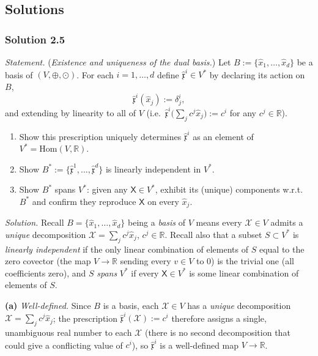 \documentclass[11pt]{article}
\newcommand{\Vsp}{(V, \oplus, \odot)}
\newcommand{\dual}{V^{*}}
\begin{document}
\subsection*{Solutions}

\subsubsection*{Solution 2.5}

\noindent\textit{Statement.} (\textit{Existence and uniqueness of the dual basis.})
Let $B := \{\hat{x}_1,\dots,\hat{x}_d\}$ be a basis of $\Vsp$. For each $i = 1,\dots,d$ define $\hat{\mathfrak{x}}^i \in \dual$ by declaring its action on $B$,
\[
\hat{\mathfrak{x}}^i(\hat{x}_j) := \delta^i_j,
\]
and extending by linearity to all of $V$ (i.e.\ $\hat{\mathfrak x}^i\big(\sum_j c^j\hat x_j\big):=c^i$ for any $c^j\in\mathbb R$).
\begin{enumerate}[label=(\alph*)]
  \item Show this prescription uniquely determines $\hat{\mathfrak{x}}^i$ as an element of $\dual = \mathrm{Hom}(V,\mathbb{R})$.
  \item Show $B^* := \{\hat{\mathfrak{x}}^1,\dots,\hat{\mathfrak{x}}^d\}$ is linearly independent in $\dual$.
  \item Show $B^*$ spans $\dual$: given any $\mathsf{X} \in \dual$, exhibit its (unique) components w.r.t.\ $B^*$ and confirm they reproduce $\mathsf{X}$ on every $\hat{x}_j$.
\end{enumerate}

\medskip
\noindent\textit{Solution.} Recall $B=\{\hat x_1,\dots,\hat x_d\}$ being a \emph{basis} of $V$ means every $\mathcal X\in V$ admits a \emph{unique} decomposition $\mathcal X=\sum_jc^j\hat x_j$, $c^j\in\mathbb R$. Recall also that a subset $S\subset\dual$ is \emph{linearly independent} if the only linear combination of elements of $S$ equal to the zero covector (the map $V\to\mathbb R$ sending every $v\in V$ to $0$) is the trivial one (all coefficients zero), and $S$ \emph{spans} $\dual$ if every $\mathsf X\in\dual$ is some linear combination of elements of $S$.

\textbf{(a)} \emph{Well-defined.} Since $B$ is a basis, each $\mathcal X\in V$ has a \emph{unique} decomposition $\mathcal X=\sum_jc^j\hat x_j$; the prescription $\hat{\mathfrak x}^i(\mathcal X):=c^i$ therefore assigns a single, unambiguous real number to each $\mathcal X$ (there is no second decomposition that could give a conflicting value of $c^i$), so $\hat{\mathfrak x}^i$ is a well-defined map $V\to\mathbb R$.
\end{document}
